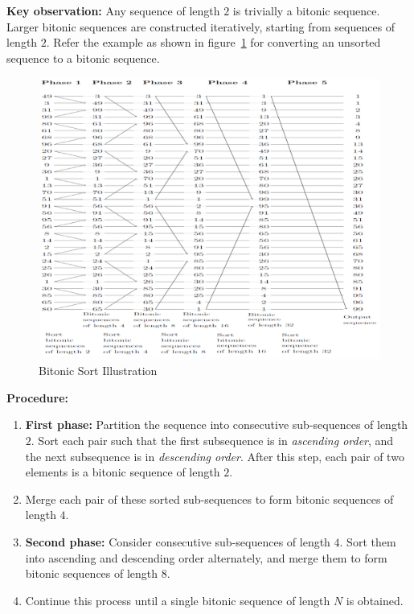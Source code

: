 \documentclass[12pt]{book}
\begin{document}
\medskip
\noindent
\textbf{Key observation:} Any sequence of length $2$ is trivially a bitonic sequence. Larger bitonic sequences are constructed iteratively, starting from sequences of length $2$. Refer the example as shown in figure~\ref{fig:bitonicsort} for converting an unsorted sequence to a bitonic sequence.
\begin{figure}[ht]
    \centering
    \includegraphics[width=\linewidth]{images/BitonicSort.png}
    \caption{Bitonic Sort Illustration}
    \label{fig:bitonicsort}
\end{figure}
\medskip
\noindent
\textbf{Procedure:}
\begin{enumerate}
    \item \textbf{First phase:} Partition the sequence into consecutive sub-sequences of length $2$. Sort each pair such that the first subsequence is in \emph{ascending order}, and the next subsequence is in \emph{descending order}. After this step, each pair of two elements is a bitonic sequence of length $2$.
    \item Merge each pair of these sorted sub-sequences to form bitonic sequences of length $4$.
    \item \textbf{Second phase:} Consider consecutive sub-sequences of length $4$. Sort them into ascending and descending order alternately, and merge them to form bitonic sequences of length $8$.
    \item Continue this process until a single bitonic sequence of length $N$ is obtained.
\end{enumerate}
\end{document}
